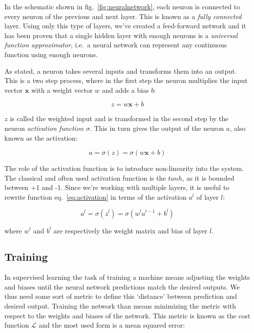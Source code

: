 \documentclass[12pt,a4paper,]{harvard-thesis}
\begin{document}
In the schematic shown in fig.~\ref{fig:neuralnetwork}, each neuron is
connected to every neuron of the previous and next layer. This is known
as a \emph{fully connected} layer. Using only this type of layers, we've
created a feed-forward network and it has been proven that a single
hidden layer with enough neurons is a \emph{universal function
approximator}, i.e.~a neural network can represent any continuous
function using enough neurons.

As stated, a neuron takes several inputs and transforms them into an
output. This is a two step process, where in the first step the neuron
multiplies the input vector \(\mathbf{x}\) with a weight vector \(w\)
and adds a bias \(b\):

\begin{equation}
z = w\mathbf{x}+b
\label{eq:weighted_input}\end{equation}

\(z\) is called the weighted input and is transformed in the second step
by the neuron \emph{activation function \(\sigma\)}. This in turn gives
the output of the neuron \(a\), also known as the activation:

\begin{equation}
a = \sigma(z) = \sigma(w\mathbf{x}+b)
\label{eq:activation}\end{equation}

The role of the activation function is to introduce non-linearity into
the system. The classical and often used activation function is the
\(tanh\), as it is bounded between +1 and -1. Since we're working with
multiple layers, it is useful to rewrite function
eq.~\ref{eq:activation} in terms of the activation \(a^l\) of layer
\(l\):

\[
a^l = \sigma(z^l) = \sigma(w^la^{l-1}+b^l)
\]

where \(w^l\) and \(b^l\) are respectively the weight matrix and bias of
layer \(l\).

\hypertarget{training}{%
\subsection{Training}\label{training}}

In supervised learning the task of training a machine means adjusting
the weights and biases until the neural network predictions match the
desired outputs. We thus need some sort of metric to define this
`distance' between prediction and desired output. Training the network
than means minimizing the metric with respect to the weights and biases
of the network. This metric is known as the cost function
\(\mathcal{L}\) and the most used form is a mean squared error:
\end{document}
